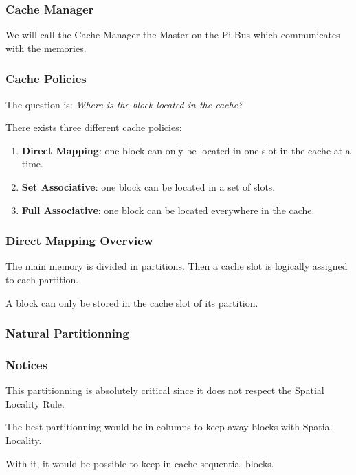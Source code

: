 
\begin{frame}
  \frametitle{Cache Manager}

  We will call the Cache Manager the Master on the Pi-Bus which communicates
  with the memories.

  \begin{center}
  \end{center}
\end{frame}


\begin{frame}
  \frametitle{Cache Policies}

  The question is: \textit{Where is the block located in the cache?}

  \-

  There exists three different cache policies:

  \begin{enumerate}
    \item
      \textbf{Direct Mapping}: one block can only be located in one
      slot in the cache at a time.
    \item
      \textbf{Set Associative}: one block can be located in a set of
      slots.
    \item
      \textbf{Full Associative}: one block can be located everywhere
      in the cache.
  \end{enumerate}
\end{frame}


\begin{frame}
  \frametitle{Direct Mapping Overview}

  The main memory is divided in partitions. Then a cache slot is
  logically assigned to each partition.

  \-

  A block can only be stored in the cache slot of its partition.
\end{frame}


\begin{frame}
  \frametitle{Natural Partitionning}

  \begin{center}
  \end{center}
\end{frame}


\begin{frame}
  \frametitle{Notices}

  This partitionning is absolutely critical since it does not respect
  the Spatial Locality Rule.

  \-

  The best partitionning would be in columns to keep away blocks with
  Spatial Locality.

  \-

  With it, it would be possible to keep in cache sequential blocks.
\end{frame}

